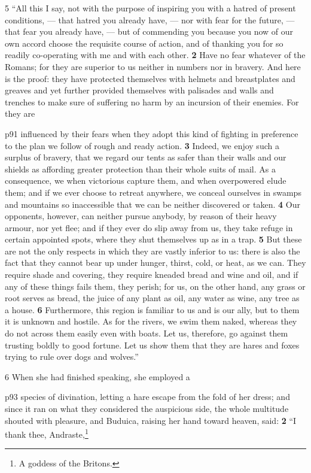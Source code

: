 5 ``All this I say, not with the purpose of inspiring you with a hatred of present conditions, \texthebrew{—} that hatred you already have, \texthebrew{—} nor with fear for the future, \texthebrew{—} that fear you already have, \texthebrew{—} but of commending you because you now of our own accord choose the requisite course of action, and of thanking you for so readily co-operating with me and with each other. \textbf{2} Have no fear whatever of the Romans; for they are superior to us neither in numbers nor in bravery. And here is the proof: they have protected themselves with helmets and breastplates and greaves and yet further provided themselves with palisades and walls and trenches to make sure of suffering no harm by an incursion of their enemies. For they are

p91 influenced by their fears when they adopt this kind of fighting in preference to the plan we follow of rough and ready action. \textbf{3} Indeed, we enjoy such a surplus of bravery, that we regard our tents as safer than their walls and our shields as affording greater protection than their whole suits of mail. As a consequence, we when victorious capture them, and when over­powered elude them; and if we ever choose to retreat anywhere, we conceal ourselves in swamps and mountains so inaccessible that we can be neither discovered or taken. \textbf{4} Our opponents, however, can neither pursue anybody, by reason of their heavy armour, nor yet flee; and if they ever do slip away from us, they take refuge in certain appointed spots, where they shut themselves up as in a trap. \textbf{5} But these are not the only respects in which they are vastly inferior to us: there is also the fact that they cannot bear up under hunger, thirst, cold, or heat, as we can. They require shade and covering, they require kneaded bread and wine and oil, and if any of these things fails them, they perish; for us, on the other hand, any grass or root serves as bread, the juice of any plant as oil, any water as wine, any tree as a house. \textbf{6} Furthermore, this region is familiar to us and is our ally, but to them it is unknown and hostile. As for the rivers, we swim them naked, whereas they do not across them easily even with boats. Let us, therefore, go against them trusting boldly to good fortune. Let us show them that they are hares and foxes trying to rule over dogs and wolves.''

6 When she had finished speaking, she employed a

p93 species of divination, letting a hare escape from the fold of her dress; and since it ran on what they considered the auspicious side, the whole multitude shouted with pleasure, and Buduica, raising her hand toward heaven, said: \textbf{2} ``I thank thee, Andraste,\texthebrew{⁠}\footnote{A goddess of the Britons.

}

